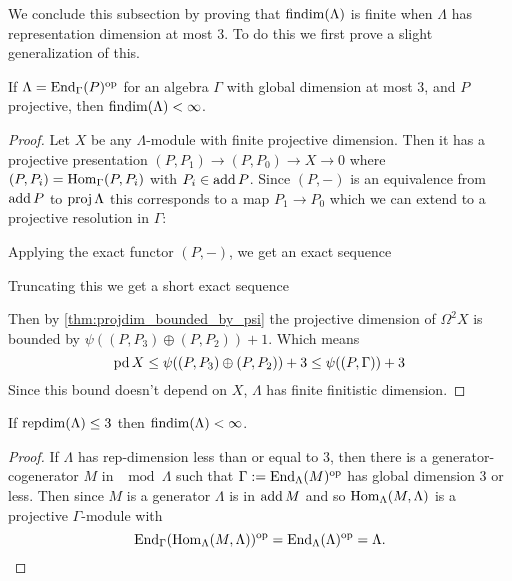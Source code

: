 We conclude this subsection by proving that $\operatorname{findim}(\Lambda)$ is finite when $\Lambda$ has representation dimension at most 3. To do this we first prove a slight generalization of this.

\begin{theorem}\cite[Corollary~8]{IgTo05}
	If $\Lambda = \operatorname{End}_\Gamma(P)^{\operatorname{op}}$ for an algebra $\Gamma$ with global dimension at most 3, and $P$ projective, then $\operatorname{findim}(\Lambda) < \infty$.
	\begin{proof}
		Let $X$ be any $\Lambda$-module with finite projective dimension. Then it has a projective presentation $(P, P_1) \to (P,P_0) \to X \to 0$ where $(P,P_i)=\operatorname{Hom}_\Gamma(P,P_i)$ with $P_i \in \operatorname{add} P$. Since $(P,-)$ is an equivalence from $\operatorname{add} P$ to $\operatorname{proj}\Lambda$ this corresponds to a map $P_1 \to P_0$ which we can extend to a projective resolution in $\Gamma$:
		\begin{center}
		\end{center}
		Applying the exact functor $(P, -)$, we get an exact sequence
		\begin{center}
		\end{center}
		Truncating this we get a short exact sequence
		\begin{center}
		\end{center}
		Then by \cref{thm:projdim_bounded_by_psi} the projective dimension of $\Omega^2 X$ is bounded by $\psi((P, P_3)\oplus (P, P_2))+1$. Which means
		$$\operatorname{pd} X \leq \psi((P, P_3)\oplus (P, P_2))+3 \leq \psi((P,\Gamma))+3$$
		Since this bound doesn't depend on $X$, $\Lambda$ has finite finitistic dimension.
	\end{proof} 
\end{theorem}

\begin{cor}\label{cor:repdim_less_than_3_implies FDC}
	If $\operatorname{repdim}(\Lambda) \leq 3$ then $\operatorname{findim}(\Lambda) < \infty$.
	\begin{proof}
		If $\Lambda$ has rep-dimension less than or equal to 3, then there is a generator-cogenerator $M$ in $\mod\Lambda$ such that $\Gamma := \operatorname{End}_\Lambda(M)^{\operatorname{op}}$ has global dimension 3 or less. Then since $M$ is a generator $\Lambda$ is in $\operatorname{add} M$ and so $\operatorname{Hom}_\Lambda(M, \Lambda)$ is a projective $\Gamma$-module with 
		$$\operatorname{End}_\Gamma(\operatorname{Hom}_\Lambda(M, \Lambda))^{\operatorname{op}} = \operatorname{End}_\Lambda(\Lambda)^{\operatorname{op}} = \Lambda.$$
	\end{proof}
\end{cor}
